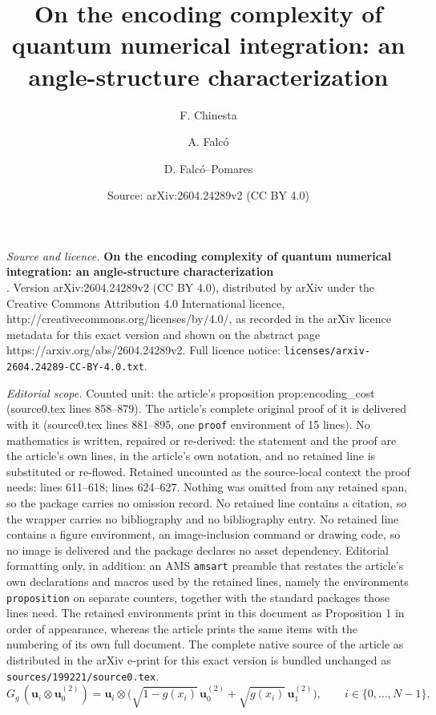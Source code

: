 \documentclass[10pt,a4paper]{amsart}
\title{\textbf{On the encoding complexity of quantum numerical integration: an angle-structure characterization}\\[6pt]}
\author{F. Chinesta \and A. Falcó \and D. Falcó--Pomares}
\date{Source: arXiv:2604.24289v2 (CC BY 4.0)}
\begin{document}
\maketitle

\noindent\emph{Source and licence.} \textbf{On the encoding complexity of quantum numerical integration: an angle-structure characterization}\\[6pt]. Version arXiv:2604.24289v2 (CC BY 4.0), distributed by arXiv under the Creative Commons Attribution 4.0 International licence, http://creativecommons.org/licenses/by/4.0/, as recorded in the arXiv licence metadata for this exact version and shown on the abstract page https://arxiv.org/abs/2604.24289v2. Full licence notice: \texttt{licenses/arxiv-2604.24289-CC-BY-4.0.txt}.\par\smallskip

\noindent\textit{Editorial scope.} Counted unit: the article's proposition prop:encoding\_cost (source0.tex lines 858--879). The article's complete original proof of it is delivered with it (source0.tex lines 881--895, one \texttt{proof} environment of 15 lines). No mathematics is written, repaired or re-derived: the statement and the proof are the article's own lines, in the article's own notation, and no retained line is substituted or re-flowed.  Retained uncounted as the source-local context the proof needs: lines 611--618; lines 624--627.  Nothing was omitted from any retained span, so the package carries no omission record.  No retained line contains a citation, so the wrapper carries no bibliography and no bibliography entry.  No retained line contains a figure environment, an image-inclusion command or drawing code, so no image is delivered and the package declares no asset dependency.  Editorial formatting only, in addition: an AMS \texttt{amsart} preamble that restates the article's own declarations and macros used by the retained lines, namely the environments \texttt{proposition} on separate counters, together with the standard packages those lines need.  The retained environments print in this document as Proposition 1 in order of appearance, whereas the article prints the same items with the numbering of its own full document.  The complete native source of the article as distributed in the arXiv e-print for this exact version is bundled unchanged as \texttt{sources/199221/source0.tex}.
\begin{equation}
  G_g\,(\mathbf{u}_i\otimes\mathbf{u}_0^{(2)})
  = \mathbf{u}_i\otimes
    \bigl(\sqrt{1-g(x_i)}\,\mathbf{u}_0^{(2)}
         +\sqrt{g(x_i)}\,\mathbf{u}_1^{(2)}\bigr),
  \qquad i\in\{0,\ldots,N-1\},
  \label{eq:Gg_def}
\end{equation}
\end{document}
